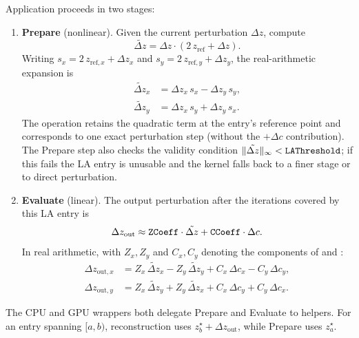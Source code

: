Application proceeds in two stages:
\begin{enumerate}
  \item \textbf{Prepare} (nonlinear).  Given the current perturbation
        \(\Delta z\), compute
        \begin{equation}
        \tilde{\Delta z} = \Delta z\cdot(2\,z_\mathrm{ref} + \Delta z).
        \label{eq:la-prepare}
        \end{equation}
        Writing $s_x = 2\,z_{\mathrm{ref},x} + \Delta z_x$ and
        $s_y = 2\,z_{\mathrm{ref},y} + \Delta z_y$, the real-arithmetic
        expansion is
        \begin{align}
        \tilde{\Delta z}_x &= \Delta z_x\,s_x - \Delta z_y\,s_y, \\
        \tilde{\Delta z}_y &= \Delta z_x\,s_y + \Delta z_y\,s_x.
        \end{align}
        The operation retains the quadratic term at the entry's reference point and
        corresponds to one exact perturbation step (without the
        \(+\Delta c\) contribution).  The Prepare step also checks the
        validity condition
        \(\lVert\tilde{\Delta z}\rVert_\infty < \texttt{LAThreshold}\);
        if this fails the LA entry is unusable and the kernel falls back
        to a finer stage or to direct perturbation.

  \item \textbf{Evaluate} (linear).  The output perturbation after the
        iterations covered by this LA entry is
        \begin{equation}
        \Delta z_\mathrm{out}
          \approx \texttt{ZCoeff}\cdot\tilde{\Delta z}
          + \texttt{CCoeff}\cdot\Delta c.
        \label{eq:la-evaluate}
        \end{equation}
        In real arithmetic, with $Z_x,Z_y$ and $C_x,C_y$ denoting the components
        of  and :
        \begin{align}
        \Delta z_{\mathrm{out},x}
          &= Z_x\,\tilde{\Delta z}_x - Z_y\,\tilde{\Delta z}_y
           + C_x\,\Delta c_x - C_y\,\Delta c_y, \\
        \Delta z_{\mathrm{out},y}
          &= Z_x\,\tilde{\Delta z}_y + Z_y\,\tilde{\Delta z}_x
           + C_x\,\Delta c_y + C_y\,\Delta c_x.
        \end{align}
\end{enumerate}
The CPU  and GPU  wrappers both
delegate Prepare and Evaluate to  helpers.
For an entry spanning $[a,b)$, reconstruction uses
$z_b^\star+\Delta z_{\mathrm{out}}$, while Prepare uses $z_a^\star$.

